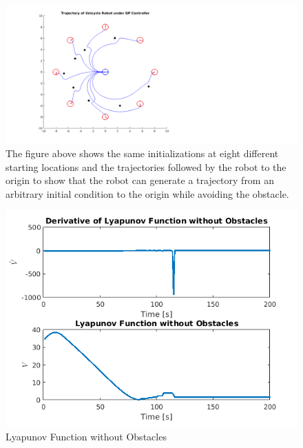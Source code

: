 \documentclass[journal]{IEEEconf}
\begin{document}
\begin{figure}[h!]
\centering
\includegraphics[scale=0.3]{octoPlotProofEditSqur.png} 
\caption{The figure above shows the same initializations at eight different starting locations and the trajectories followed by the robot to the origin to show that the robot can generate a trajectory from an arbitrary initial condition to the origin while avoiding the obstacle.\label{fig:octoplot}} 
\end{figure}

\begin{figure}[h!]
\centering
\includegraphics[scale=0.63]{vsans1.png} 
\caption{Lyapunov Function without Obstacles\label{fig:lyapunovsans}} 
\end{figure}
\end{document}

